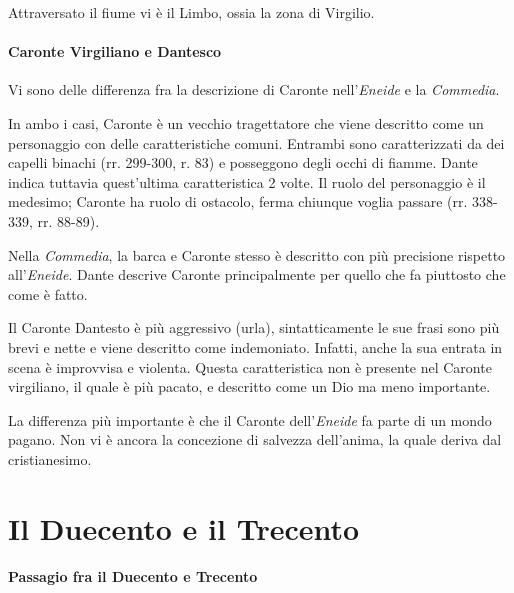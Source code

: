 \documentclass[a4paper]{article}
\begin{document}
Attraversato il fiume vi è il Limbo, ossia la zona di Virgilio.

\pagebreak

\subsection{Caronte Virgiliano e Dantesco}


Vi sono delle differenza fra la descrizione di Caronte nell'\textit{Eneide}
e la \textit{Commedia}.

In ambo i casi, Caronte è un vecchio tragettatore che viene descritto come un personaggio con
delle caratteristiche comuni.
Entrambi sono caratterizzati da dei capelli binachi (rr. 299-300, r. 83) e posseggono
degli occhi di fiamme. Dante indica tuttavia quest'ultima caratteristica 2 volte.
Il ruolo del personaggio è il medesimo; Caronte ha ruolo di ostacolo, ferma chiunque voglia passare
(rr. 338-339, rr. 88-89).

Nella \textit{Commedia}, la barca e Caronte stesso è descritto con più precisione
rispetto all'\textit{Eneide}.
Dante descrive Caronte principalmente per quello che fa piuttosto che come è fatto.

Il Caronte Dantesto è più aggressivo (urla), sintatticamente le sue frasi sono
più brevi e nette e viene descritto come indemoniato. Infatti, anche la sua entrata in scena
è improvvisa e violenta. Questa caratteristica non è presente nel Caronte virgiliano,
il quale è più pacato, e descritto come un Dio ma meno importante.

La differenza più importante è che il Caronte dell'\textit{Eneide} fa parte di un mondo pagano.
Non vi è ancora la concezione di salvezza dell'anima, la quale deriva dal cristianesimo.

\pagebreak

\part{Il Duecento e il Trecento}

\subsection{Passagio fra il Duecento e Trecento}
\end{document}
